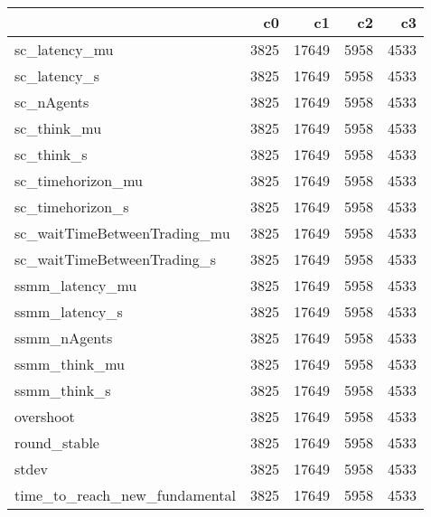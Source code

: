 \begin{tabular}{lrrrr}
\toprule
{} &    c0 &     c1 &    c2 &    c3 \\
\midrule
sc\_latency\_mu                 &  3825 &  17649 &  5958 &  4533 \\
sc\_latency\_s                  &  3825 &  17649 &  5958 &  4533 \\
sc\_nAgents                    &  3825 &  17649 &  5958 &  4533 \\
sc\_think\_mu                   &  3825 &  17649 &  5958 &  4533 \\
sc\_think\_s                    &  3825 &  17649 &  5958 &  4533 \\
sc\_timehorizon\_mu             &  3825 &  17649 &  5958 &  4533 \\
sc\_timehorizon\_s              &  3825 &  17649 &  5958 &  4533 \\
sc\_waitTimeBetweenTrading\_mu  &  3825 &  17649 &  5958 &  4533 \\
sc\_waitTimeBetweenTrading\_s   &  3825 &  17649 &  5958 &  4533 \\
ssmm\_latency\_mu               &  3825 &  17649 &  5958 &  4533 \\
ssmm\_latency\_s                &  3825 &  17649 &  5958 &  4533 \\
ssmm\_nAgents                  &  3825 &  17649 &  5958 &  4533 \\
ssmm\_think\_mu                 &  3825 &  17649 &  5958 &  4533 \\
ssmm\_think\_s                  &  3825 &  17649 &  5958 &  4533 \\
overshoot                     &  3825 &  17649 &  5958 &  4533 \\
round\_stable                  &  3825 &  17649 &  5958 &  4533 \\
stdev                         &  3825 &  17649 &  5958 &  4533 \\
time\_to\_reach\_new\_fundamental &  3825 &  17649 &  5958 &  4533 \\
\bottomrule
\end{tabular}
